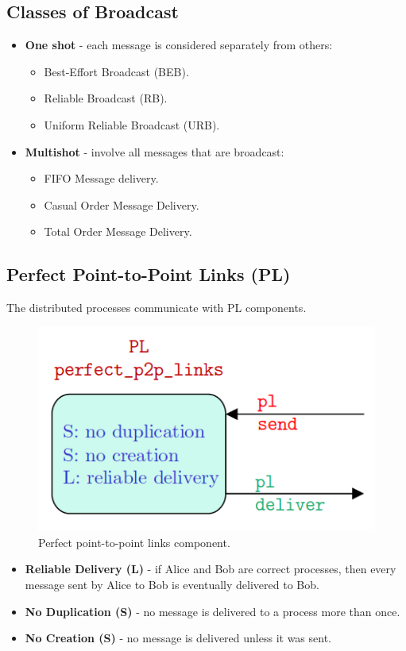 \documentclass[11pt]{article}
\begin{document}
\subsection{Classes of Broadcast}
\begin{itemize}
  \item \textbf{One shot} - each message is considered separately from others:
    \begin{itemize}
      \item Best-Effort Broadcast (BEB).
      \item Reliable Broadcast (RB).
      \item Uniform Reliable Broadcast (URB).
    \end{itemize}
  \item \textbf{Multishot} - involve all messages that are broadcast:
    \begin{itemize}
      \item FIFO Message delivery.
      \item Casual Order Message Delivery.
      \item Total Order Message Delivery.
    \end{itemize}
\end{itemize}

\subsection{Perfect Point-to-Point Links (PL)}
The distributed processes communicate with PL components.
\begin{figure}[htb!]
  \centering
  \caption{Perfect point-to-point links component.}
  \includegraphics[scale=0.3]{pl}
\end{figure}

\begin{itemize}
  \item \textbf{Reliable Delivery (L)} - if Alice and Bob are correct processes, then every message sent by Alice to Bob is eventually delivered to Bob.
  \item \textbf{No Duplication (S)} - no message is delivered to a process more than once.
  \item \textbf{No Creation (S)} - no message is delivered unless it was sent.
\end{itemize}
\end{document}
